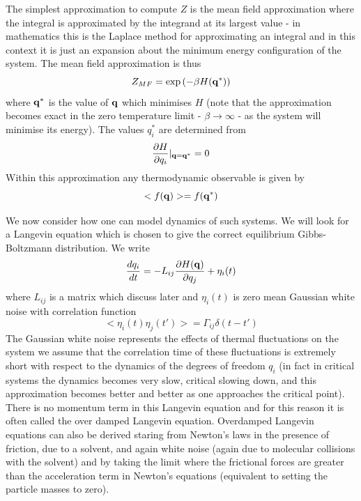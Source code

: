 The simplest approximation to compute $Z$ is the mean field approximation where the integral 
is approximated by the integrand at its largest value - in mathematics this is the Laplace method for approximating an integral and in this context it is just an expansion about the minimum energy configuration of the system. The mean field approximation is thus
\begin{equation}
    Z_{MF}= \exp\left(-\beta H({\bf q}^*)\right)
\end{equation}
where ${\bf q}^*$ is the value of ${\bf q}$ which minimises $H$ (note that the approximation becomes exact in the zero temperature limit - $\beta \to \infty$   - as the system will minimise its energy). The values $q_i^*$ are determined from
\begin{equation}
    \frac{\partial H}{\partial q_i}|_{{\bf q}={\bf q^*}}=0
\end{equation}
Within this approximation any thermodynamic observable is given by
\begin{equation}
    < f({\bf q}) > = f({\bf q}^*)
\end{equation}

We now consider how one can model dynamics of such systems. We will look for a Langevin equation which is chosen to give the correct equilibrium Gibbs-Boltzmann distribution. We write
\begin{equation}
    \frac{d q_i}{dt} = -L_{ij}\frac{\partial H({\bf q})}{ \partial q_j} + \eta_i(t)
\end{equation}
where $L_{ij}$ is a matrix which discuss later and $\eta_i(t)$ is zero mean Gaussian white noise  with correlation function 
\begin{equation}
    < \eta_i(t)\eta_j(t')> =  \Gamma_{ij} \delta(t-t')
    \label{cfn}
\end{equation}
The Gaussian white noise represents the effects of thermal fluctuations on the system we assume that the correlation time of these fluctuations is extremely short with respect to the dynamics of the degrees of freedom $q_i$ (in fact in critical systems the dynamics becomes very slow, critical slowing down, and this approximation becomes better and better as one approaches the critical point).  There is no momentum term in this Langevin equation and for this reason it is often called the over damped Langevin equation. Overdamped Langevin equations can also be derived staring from Newton's laws in the presence of friction, due to a solvent, and again white noise (again due to molecular collisions with the solvent) and by taking the limit where the frictional forces are greater than the acceleration term in Newton's equations (equivalent to setting the particle masses to zero).


